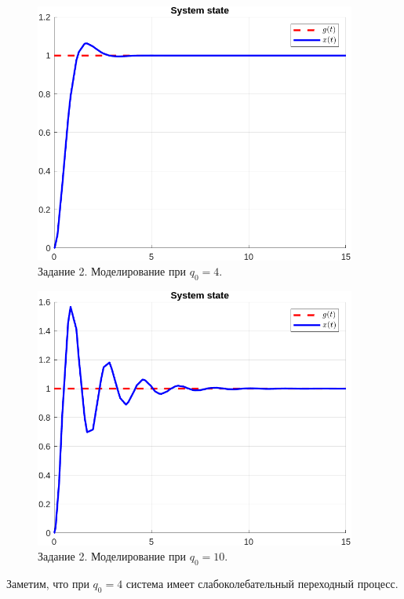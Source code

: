 \documentclass[a4paper, 14pt]{extarticle}
\theoremstyle{definition}
\theoremstyle{plain}
\theoremstyle{remark}
\begin{document}
\begin{figure}
    [H]
    \centering
    \includegraphics[width=300pt]{images/task2__q0_4_state.png}
    \caption{Задание 2. Моделирование при $q_0 = 4$.}
    \label{fig:task2__q0_4_state}
\end{figure}
\begin{figure}
    [H]
    \centering
    \includegraphics[width=300pt]{images/task2__q0_10_state.png}
    \caption{Задание 2. Моделирование при $q_0 = 10$.}
    \label{fig:task2__q0_10_state}
\end{figure}

Заметим, что при $q_0=4$  система имеет слабоколебательный переходный процесс.
\end{document}
